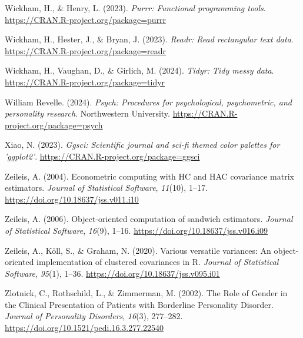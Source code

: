 \documentclass[
  man,floatsintext]{apa7}
\newlength{\cslhangindent}
\newlength{\cslentryspacingunit} %
\newenvironment{CSLReferences}[2] %
 {%
  \setlength{\parindent}{0pt}
  \ifodd #1
  \let\oldpar\par
  \def\par{\hangindent=\cslhangindent\oldpar}
  \fi
  \setlength{\parskip}{#2\cslentryspacingunit}
 }%
 {}
\begin{document}
\begin{CSLReferences}{1}{0}
\leavevmode{}%
Wickham, H., \& Henry, L. (2023). \emph{Purrr: Functional programming tools}. \url{https://CRAN.R-project.org/package=purrr}

\leavevmode{}%
Wickham, H., Hester, J., \& Bryan, J. (2023). \emph{Readr: Read rectangular text data}. \url{https://CRAN.R-project.org/package=readr}

\leavevmode{}%
Wickham, H., Vaughan, D., \& Girlich, M. (2024). \emph{Tidyr: Tidy messy data}. \url{https://CRAN.R-project.org/package=tidyr}

\leavevmode{}%
William Revelle. (2024). \emph{Psych: Procedures for psychological, psychometric, and personality research}. Northwestern University. \url{https://CRAN.R-project.org/package=psych}

\leavevmode{}%
Xiao, N. (2023). \emph{Ggsci: Scientific journal and sci-fi themed color palettes for 'ggplot2'}. \url{https://CRAN.R-project.org/package=ggsci}

\leavevmode{}%
Zeileis, A. (2004). Econometric computing with {HC} and {HAC} covariance matrix estimators. \emph{Journal of Statistical Software}, \emph{11}(10), 1--17. \url{https://doi.org/10.18637/jss.v011.i10}

\leavevmode{}%
Zeileis, A. (2006). Object-oriented computation of sandwich estimators. \emph{Journal of Statistical Software}, \emph{16}(9), 1--16. \url{https://doi.org/10.18637/jss.v016.i09}

\leavevmode{}%
Zeileis, A., Köll, S., \& Graham, N. (2020). Various versatile variances: An object-oriented implementation of clustered covariances in {R}. \emph{Journal of Statistical Software}, \emph{95}(1), 1--36. \url{https://doi.org/10.18637/jss.v095.i01}

\leavevmode{}%
Zlotnick, C., Rothschild, L., \& Zimmerman, M. (2002). The {Role} of {Gender} in the {Clinical Presentation} of {Patients} with {Borderline Personality Disorder}. \emph{Journal of Personality Disorders}, \emph{16}(3), 277--282. \url{https://doi.org/10.1521/pedi.16.3.277.22540}

\end{CSLReferences}
\end{document}
